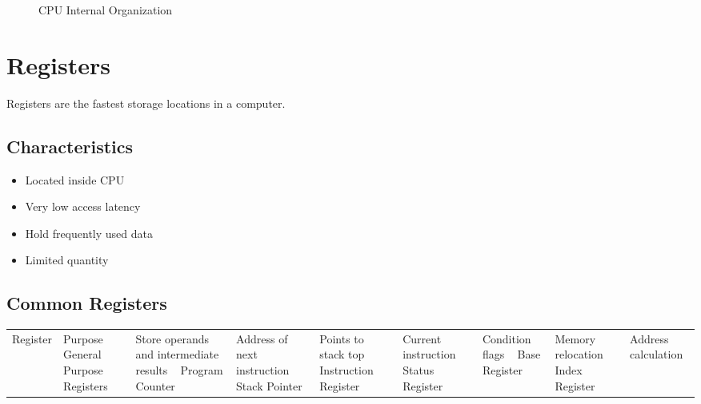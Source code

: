 \begin{figure}[H]
\centering
{}
\caption{CPU Internal Organization}
\end{figure}

\section{Registers}

Registers are the fastest storage locations in a computer.

\subsection{Characteristics}

\begin{itemize}
\item Located inside CPU
\item Very low access latency
\item Hold frequently used data
\item Limited quantity
\end{itemize}

\subsection{Common Registers}

\begin{longtable}{|p{4cm}|p{9cm}|}
\hline
Register & Purpose \
\hline
General Purpose Registers & Store operands and intermediate results \
\hline
Program Counter & Address of next instruction \
\hline
Stack Pointer & Points to stack top \
\hline
Instruction Register & Current instruction \
\hline
Status Register & Condition flags \
\hline
Base Register & Memory relocation \
\hline
Index Register & Address calculation \
\hline
\end{longtable}

